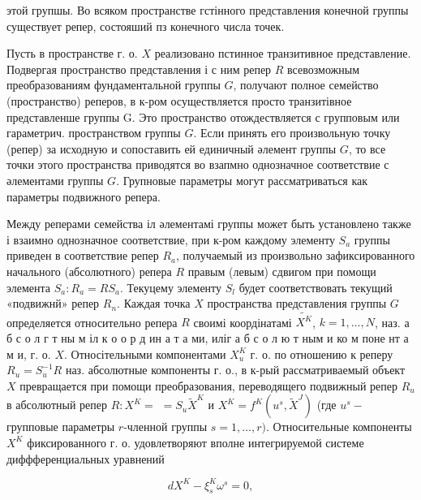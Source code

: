 \documentclass[10pt]{article}
\begin{document}
этой групшы. Во всяком пространстве гстінного представления конечной группы существует репер, состояший пз конечного числа точек.



Пусть в пространстве г. о. $X$ реализовано пстинное транзитивное представление. Подвергая пространство представления і с ним репер $R$ всевозможным преобразованиям фундаментальной группы $G$, получают полное семейство (пространство) реперов, в к-ром осуществляется просто транзитівное представленше группы G. Это пространство отождествляется с групповым или гараметрич. пространством группы $G$. Если принять его произвольную точку (репер) за исходную и сопоставить ей единичный әлемент группы $G$, то все точки этого пространства приводятся во взапмно однозначное соответствие с әлементами группы $G$. Групновые параметры могут рассматриваться как параметры подвижного репера.



Между реперами семейства іл әлементамі группы может быть установлено также і взаимно однозначное соответствие, при к-ром каждому элементу $S_{a}$ группы приведен в соответствие репер $R_{a}$, получаемый из произвольно зафиксированного начального (абсолютного) репера $R$ правым (левым) сдвигом при помощи элемента $S_{a}: R_{a}=R S_{a}$. Текуцему элементу $S_{l}$ будет соответствовать текущий «подвижнй» репер $R_{n}$. Каждая точка $X$ пространства представления группы $G$ определяется относительно репера $R$ своимі коордінатамі $\tilde{X^{K}}$, $k=1, \ldots, N$, наз. а б с о л г т ны м іл к о о р д ин а т а ми, иліг а б с о л ю т ным и ко м поне нт а м и, г. о. $X$. Относітельными компонентами $X_{u}^{K}$ г. о. по отношению к реперу $R_{u}=S_{u}^{-1} R$ наз. абсолютные компоненты г. о., в к-рый рассматриваемый объект $X$ превращается при помощи преобразования, переводящего подвижный репер $R_{u}$ в абсолютный репер $R: X^{K}=$ $=S_{u} \tilde{X}^{K}$ и $X^{K}=f^{K}\left(u^{s}, \tilde{X}^{J}\right)$ (где $u^{s}-$ групповые параметры $r$-членной группы $s=1, \ldots, r)$. Относительные компоненты $X^{K}$ фиксированного г. о. удовлетворяют вполне интегрируемой системе диффференциальных уравнений



\[

d X^{K}-\xi_{s}^{K} \omega^{s}=0,

\]
\end{document}

